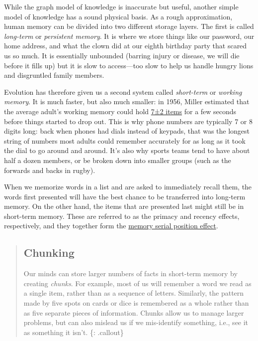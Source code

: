 While the graph model of knowledge is inaccurate but useful, another
simple model of knowledge has a sound physical basis. As a rough
approximation, human memory can be divided into two different storage
layers. The first is called \emph{long-term} or \emph{persistent
memory}. It is where we store things like our password, our home
address, and what the clown did at our eighth birthday party that scared
us so much. It is essentially unbounded (barring injury or disease, we
will die before it fills up) but it is slow to access---too slow to help
us handle hungry lions and disgruntled family members.

Evolution has therefore given us a second system called
\emph{short-term} or \emph{working memory}. It is much faster, but also
much smaller: in 1956, Miller estimated that the average adult's working
memory could hold
\href{https://en.wikipedia.org/wiki/The\_Magical\_Number\_Seven,\_Plus\_or\_Minus\_Two}{7±2
items} for a few seconds before things started to drop out. This is why
phone numbers are typically 7 or 8 digits long: back when phones had
dials instead of keypads, that was the longest string of numbers most
adults could remember accurately for as long as it took the dial to go
around and around. It's also why sports teams tend to have about half a
dozen members, or be broken down into smaller groups (such as the
forwards and backs in rugby).

When we memorize words in a list and are asked to immediately recall
them, the words first presented will have the best chance to be
transferred into long-term memory. On the other hand, the items that are
presented last might still be in short-term memory. These are referred
to as the primacy and recency effects, respectively, and they together
form the
\href{https://en.wikipedia.org/wiki/Serial\_position\_effect}{memory
serial position effect}.

\begin{quote}
\subsection{Chunking}\label{chunking}

Our minds can store larger numbers of facts in short-term memory by
creating \emph{chunks}. For example, most of us will remember a word we
read as a single item, rather than as a sequence of letters. Similarly,
the pattern made by five spots on cards or dice is remembered as a whole
rather than as five separate pieces of information. Chunks allow us to
manage larger problems, but can also mislead us if we mis-identify
something, i.e., see it as something it isn't. \{: .callout\}
\end{quote}

